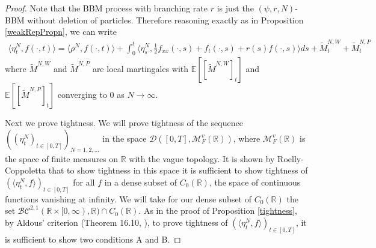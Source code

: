 \documentclass{article}
\newcommand{\B}[1]{\mathbb{#1}}
\newcommand{\C}[1]{\mathcal{#1}}
\begin{document}
\begin{proof}
    Note that the BBM process with branching rate $r$ is just the $(\psi,r,N)$-BBM without deletion of particles. Therefore reasoning exactly as in Proposition \ref{weakRepPropn}, we can write
    \begin{align} \label{bbmRep}\langle \eta_t^N,f(\cdot,t)\rangle = \langle \rho^N,f(\cdot,t)\rangle + \int_0^t \langle \eta_s^N,\frac12 f_{xx}(\cdot,s)+f_t(\cdot,s)+r(s)f(\cdot,s)\rangle ds + \tilde{M}_t^{N,W}+\tilde{M}^{N,P}_t    \end{align}
    where $\tilde{M}^{N,W}$ and $\tilde{M}^{N,P}$ are local martingales with $\B{E}[[\tilde{M}^{N,W}]_t]$ and $\B{E}[[\tilde{M}^{N,P}]_t]$ converging to $0$ as $N\to\infty$. 

    Next we prove tightness. We will prove tightness of the sequence $((\eta_t^N)_{t\in [0,T]})_{N=1,2,\ldots}$ in the space $\C{D}([0,T],\C{M}^v_F(\B{R}))$, where $\C{M}_F^v(\B{R})$ is the space of finite measures on $\B{R}$ with the vague topology. It is shown by Roelly-Coppoletta \cite{roellyCop} that to show tightness in this space it is sufficient to show tightness of $(\langle \eta_t^N,f\rangle)_{t\in [0,T]}$ for all $f$ in a dense subset of $C_0(\B{R})$, the space of continuous functions vanishing at infinity. We will take for our dense subset of $C_0(\B{R})$ the set $\C{BC}^{2,1}(\B{R}\times [0,\infty),\B{R})\cap C_0(\B{R})$. As in the proof of Proposition \ref{tightness}, by Aldous' criterion (Theorem 16.10, \cite{billingsley}), to prove tightness of $(\langle \eta_t^N,f\rangle)_{t\in [0,T]}$, it is sufficient to show two conditions A and B. 


\end{proof}
\end{document}

